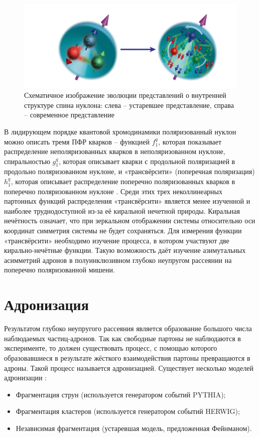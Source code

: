 \documentclass{extarticle}
\begin{document}
\begin{figure}[ht]
    \centering
    \includegraphics[width = 0.9\linewidth]{nucleo.png}
    \caption{Схематичное изображение эволюции представлений о внутренней структуре спина нуклона: слева – устаревшее представление, справа – современное представление}
    \label{fig:nucleo}
\end{figure}
 

 В лидирующем порядке квантовой хромодинамики поляризованный нуклон можно описать тремя ПФР кварков – функцией $f_1^q$, которая показывает распределение неполяризованных кварков в неполяризованном нуклоне, спиральностью $g_1^q$, которая описывает кварки с продольной поляризацией в продольно поляризованном нуклоне, и «трансвёрсити» (поперечная поляризация) $h_1^q$, которая описывает распределение поперечно поляризованных кварков в поперечно поляризованном нуклоне \cite{Hagler}. Среди этих трех неколлинеарных партонных функций распределения «трансвёрсити» является менее изученной и наиболее труднодоступной из-за её киральной нечетной природы. Киральная нечётность означает, что при зеркальном отображении системы относительно оси координат симметрия системы не будет сохраняться.
Для измерения функции «трансвёрсити» необходимо изучение процесса, в котором участвуют две кирально-нечётные функции. Такую возможность даёт изучение азимутальных асимметрий адронов в полуинклюзивном глубоко неупругом рассеянии на поперечно поляризованной мишени. 


\newpage

\section{Адронизация}
Результатом глубоко неупругого рассеяния является образование большого числа наблюдаемых частиц-адронов. Так как свободные партоны не наблюдаются в эксперименте, то должен существовать процесс, с помощью которого образовавшиеся в результате жёсткого взаимодействия партоны превращаются в адроны. Такой процесс называется адронизацией. Существует несколько моделей адронизации  \cite{Hadronization}:
\begin{itemize}
\item Фрагментация струн (используется генератором событий PYTHIA);
\item Фрагментация кластеров (используется генератором событий HERWIG);
\item Независимая фрагментация (устаревшая модель, предложенная Фейнманом).
\end{itemize}
 
\end{document}
